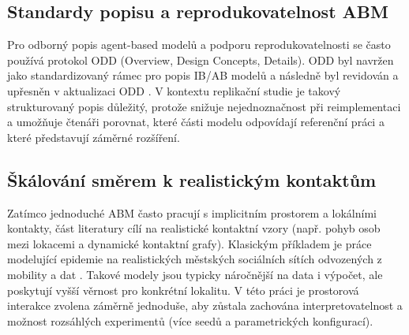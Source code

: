 \documentclass{article}
\begin{document}
\subsection{Standardy popisu a reprodukovatelnost ABM}

Pro odborný popis agent-based modelů a podporu reprodukovatelnosti se často používá protokol ODD (Overview, Design Concepts, Details). ODD byl navržen jako standardizovaný rámec pro popis IB/AB modelů \cite{grimm-2006-odd} a následně byl revidován a upřesněn v aktualizaci ODD \cite{grimm-2010-odd-update}. V kontextu replikační studie je takový strukturovaný popis důležitý, protože snižuje nejednoznačnost při reimplementaci a umožňuje čtenáři porovnat, které části modelu odpovídají referenční práci a které představují záměrné rozšíření.

\subsection{Škálování směrem k realistickým kontaktům}

Zatímco jednoduché ABM často pracují s implicitním prostorem a lokálními kontakty, část literatury cílí na realistické kontaktní vzory (např. pohyb osob mezi lokacemi a dynamické kontaktní grafy). Klasickým příkladem je práce modelující epidemie na realistických městských sociálních sítích odvozených z mobility a dat \cite{eubank-2004-nature}. Takové modely jsou typicky náročnější na data i výpočet, ale poskytují vyšší věrnost pro konkrétní lokalitu. V této práci je prostorová interakce zvolena záměrně jednoduše, aby zůstala zachována interpretovatelnost a možnost rozsáhlých experimentů (více seedů a parametrických konfigurací).
\end{document}
